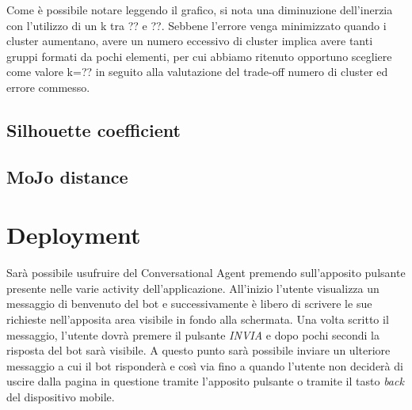 \documentclass[a4paper, 10pt]{report}
\begin{document}
        Come è possibile notare leggendo il grafico, si nota una diminuzione dell'inerzia con l'utilizzo di un k tra ?? e ??.
        Sebbene l’errore venga minimizzato quando i cluster aumentano, avere un numero eccessivo di cluster implica avere tanti gruppi
        formati da pochi elementi, per cui abbiamo ritenuto opportuno scegliere come valore k=?? in seguito alla valutazione
        del trade-off numero di cluster ed errore commesso.

        \section{Silhouette coefficient}\label{sec:silhouette-coefficient}


        \section{MoJo distance}\label{sec:mojo-distance}


    \chapter{Deployment}\label{ch:deployment}

        Sarà possibile usufruire del Conversational Agent premendo sull'apposito pulsante presente nelle varie activity dell'applicazione.
        All'inizio l'utente visualizza un messaggio di benvenuto del bot e successivamente è libero di scrivere le sue
        richieste nell'apposita area visibile in fondo alla schermata. Una volta scritto il messaggio, l'utente dovrà premere il pulsante
        \textit{INVIA} e dopo pochi secondi la risposta del bot sarà visibile. A questo punto sarà possibile inviare un ulteriore messaggio a cui
        il bot risponderà e così via fino a quando l'utente non deciderà di uscire dalla pagina in questione tramite l'apposito pulsante
        o tramite il tasto \textit{back} del dispositivo mobile.
\end{document}
